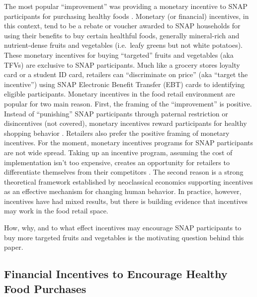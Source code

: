 \documentclass[12pt,letterpaperpaper,]{book}
\begin{document}
The most popular ``improvement'' was providing a monetary incentive to
SNAP participants for purchasing healthy foods
\citep{blumenthal_strategies_2014, leung_qualitative_2013}. Monetary (or
financial) incentives, in this context, tend to be a rebate or voucher
awarded to SNAP households for using their benefits to buy certain
healthful foods, generally mineral-rich and nutrient-dense fruits and
vegetables (i.e.~leafy greens but not white potatoes). These monetary
incentives for buying ``targeted'' fruits and vegetables (aka TFVs) are
exclusive to SNAP participants. Much like a grocery stores loyalty card
or a student ID card, retailers can ``discriminate on price'' (aka
``target the incentive'') using SNAP Electronic Benefit Transfer (EBT)
cards to identifying eligible participants. Monetary incentives in the
food retail environment are popular for two main reason. First, the
framing of the ``improvement'' is positive. Instead of ``punishing''
SNAP participants through paternal restriction or disincentives (not
covered), monetary incentives reward participants for healthy shopping
behavior \citep{gundersen_snap_2015}. Retailers also prefer the positive
framing of monetary incentives. For the moment, monetary incentives
programs for SNAP participants are not wide spread. Taking up an
incentive program, assuming the cost of implementation isn't too
expensive, creates an opportunity for retailers to differentiate
themselves from their competitors \citep{hartmann_corporate_2011}. The
second reason is a strong theoretical framework established by
neoclassical economics supporting incentives as an effective mechanism
for changing human behavior. In practice, however, incentives have had
mixed results, but there is building evidence that incentives may work
in the food retail space.

How, why, and to what effect incentives may encourage SNAP participants
to buy more targeted fruits and vegetables is the motivating question
behind this paper.

\subsection*{Financial Incentives to Encourage Healthy Food
Purchases}\label{financial-incentives-to-encourage-healthy-food-purchases}
\end{document}
